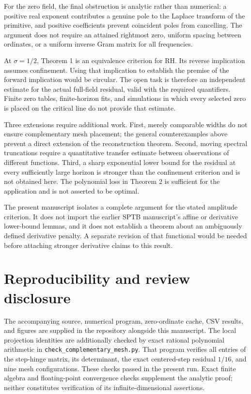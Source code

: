 \documentclass[
  11pt,
]{article}
\begin{document}
For the zero field, the final obstruction is analytic rather than
numerical: a positive real exponent contributes a genuine pole to the
Laplace transform of the primitive, and positive coefficients prevent
coincident poles from cancelling. The argument does not require an
attained rightmost zero, uniform spacing between ordinates, or a uniform
inverse Gram matrix for all frequencies.

At \(\sigma=1/2\), Theorem 1 is an equivalence criterion for RH. Its
reverse implication assumes confinement. Using that implication to
establish the premise of the forward implication would be circular. The
open task is therefore an independent estimate for the actual full-field
residual, valid with the required quantifiers. Finite zero tables,
finite-horizon fits, and simulations in which every selected zero is
placed on the critical line do not provide that estimate.

Three extensions require additional work. First, merely comparable
widths do not ensure complementary mesh placement; the general
counterexamples above prevent a direct extension of the reconstruction
theorem. Second, moving spectral truncations require a quantitative
transfer estimate between observations of different functions. Third, a
sharp exponential lower bound for the residual at every sufficiently
large horizon is stronger than the confinement criterion and is not
obtained here. The polynomial loss in Theorem 2 is sufficient for the
application and is not asserted to be optimal.

The present manuscript isolates a complete argument for the stated
amplitude criterion. It does not import the earlier SPTB manuscript's
affine or derivative lower-bound lemmas, and it does not establish a
theorem about an ambiguously defined derivative penalty. A separate
revision of that functional would be needed before attaching stronger
derivative claims to this result.

\hypertarget{reproducibility-and-review-disclosure}{%
\section{Reproducibility and review
disclosure}\label{reproducibility-and-review-disclosure}}

The accompanying source, numerical program, zero-ordinate cache, CSV
results, and figures are supplied in the repository alongside this
manuscript. The local projection identities are additionally checked by
exact rational polynomial arithmetic in
\texttt{check\_complementary\_mesh.py}. That program verifies all
entries of the step-hinge matrix, its determinant, the exact
centered-step residual \(1/16\), and nine mesh configurations. These
checks passed in the present run. Exact finite algebra and
floating-point convergence checks supplement the analytic proof; neither
constitutes verification of its infinite-dimensional assertions.
\end{document}
